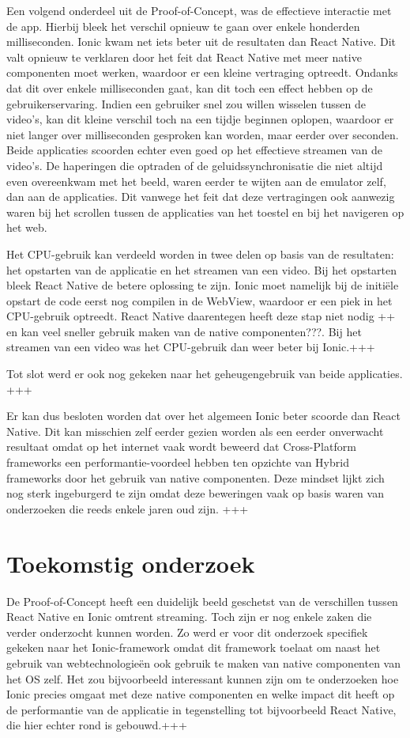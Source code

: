 Een volgend onderdeel uit de Proof-of-Concept, was de effectieve interactie met de app. Hierbij bleek het verschil opnieuw te gaan over enkele honderden milliseconden. Ionic kwam net iets beter uit de resultaten dan React Native. Dit valt opnieuw te verklaren door het feit dat React Native met meer native componenten moet werken, waardoor er een kleine vertraging optreedt. Ondanks dat dit over enkele milliseconden gaat, kan dit toch een effect hebben op de gebruikerservaring. Indien een gebruiker snel zou willen wisselen tussen de video's, kan dit kleine verschil toch na een tijdje beginnen oplopen, waardoor er niet langer over milliseconden gesproken kan worden, maar eerder over seconden. Beide applicaties scoorden echter even goed op het effectieve streamen van de video's. De haperingen die optraden of de geluidssynchronisatie die niet altijd even overeenkwam met het beeld, waren eerder te wijten aan de emulator zelf, dan aan de applicaties. Dit vanwege het feit dat deze vertragingen ook aanwezig waren bij het scrollen tussen de applicaties van het toestel en bij het navigeren op het web.

Het CPU-gebruik kan verdeeld worden in twee delen op basis van de resultaten: het opstarten van de applicatie en het streamen van een video. Bij het opstarten bleek React Native de betere oplossing te zijn. Ionic moet namelijk bij de initiële opstart de code eerst nog compilen in de WebView, waardoor er een piek in het CPU-gebruik optreedt. React Native daarentegen heeft deze stap niet nodig ++ en kan veel sneller gebruik maken van de native componenten???. Bij het streamen van een video was het CPU-gebruik dan weer beter bij Ionic.+++

Tot slot werd er ook nog gekeken naar het geheugengebruik van beide applicaties. +++

Er kan dus besloten worden dat over het algemeen Ionic beter scoorde dan React Native. Dit kan misschien zelf eerder gezien worden als een eerder onverwacht resultaat omdat op het internet vaak wordt beweerd dat Cross-Platform frameworks een performantie-voordeel hebben ten opzichte van Hybrid frameworks door het gebruik van native componenten. Deze mindset lijkt zich nog sterk ingeburgerd te zijn omdat deze beweringen vaak op basis waren van onderzoeken die reeds enkele jaren oud zijn. +++

\section{Toekomstig onderzoek}
\label{sec:toekomstig-onderzoek}

De Proof-of-Concept heeft een duidelijk beeld geschetst van de verschillen tussen React Native en Ionic omtrent streaming. Toch zijn er nog enkele zaken die verder onderzocht kunnen worden. Zo werd er voor dit onderzoek specifiek gekeken naar het Ionic-framework omdat dit framework toelaat om naast het gebruik van webtechnologieën ook gebruik te maken van native componenten van het OS zelf. Het zou bijvoorbeeld interessant kunnen zijn om te onderzoeken hoe Ionic precies omgaat met deze native componenten en welke impact dit heeft op de performantie van de applicatie in tegenstelling tot bijvoorbeeld React Native, die hier echter rond is gebouwd.+++



